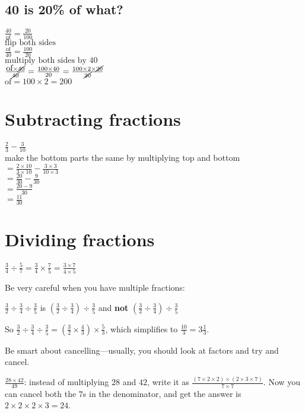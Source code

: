 \documentclass[fullpage,twocolumn]{article}
\begin{document}
\subsection{40 is 20\% of what?}

${\frac{40}{\mbox{of}} = \frac{20}{100}}$  \\
${\mbox{flip both sides} }$ \\
${\frac{\mbox{of}}{40} = \frac{100}{20}}$  \\
${\mbox{multiply both sides by 40}} $ \\
${\frac{\mbox{of} \times \cancel{40}}{\cancel{40}} = \frac{100 \times 40}{20} = \frac{100 \times 2 \times \cancel{20}}{\cancel{20}}} $ \\
${\mbox{of} = 100 \times 2 = 200} $


\section{Subtracting fractions}
${\frac{2}{3} - \frac{3}{10}}$ \\
make the bottom parts the same by multiplying top and bottom \\
${= \frac{2 \times 10}{ 3 \times 10} - \frac{3 \times 3}{10 \times 3}}$ \\
${ = \frac{20}{30} - \frac{9}{30}}$ \\
${ = \frac{20 - 9 }{30 }} $\\
${ = \frac{11}{30}}$

\section{Dividing fractions}

$\frac{3}{4} \div \frac{5}{7} = \frac{3}{4} \times \frac{7}{5} = \frac{3 \times 7 }{4 \times 5}$

Be very careful when you have multiple fractions:

$\frac{3}{2} \div \frac{3}{4} \div \frac{3}{5}$ is $(\frac{3}{2} \div \frac{3}{4})\div \frac{3}{5}$
and {\bf not} $(\frac{3}{2} \div \frac{3}{4})\div \frac{3}{5}$

So $\frac{3}{2} \div \frac{3}{4} \div \frac{3}{5} = (\frac{3}{2} \times \frac{4}{3}) \times \frac{5}{3}$, which simplifies to $\frac{10}{3} = 3 \frac{1}{3}$.

Be smart about cancelling---usually, you should look at factors and try and cancel.

$\frac{28 \times 42}{49}$: instead of multiplying $28$ and $42$, write it as 
$\frac{(7 \times 2 \times 2)\times (2 \times 3 \times 7)}{7 \times 7}$. Now you can cancel
both the $7$s in the denominator, and get the answer is $2 \times 2 \times 2 \times 3 = 24$.
\end{document}
